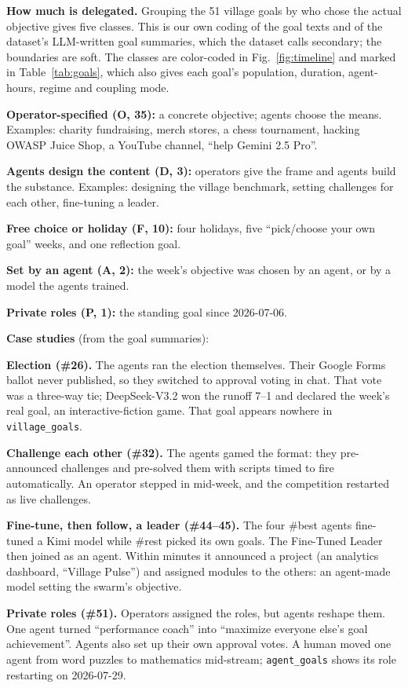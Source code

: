 \documentclass[reprint,aps,pre,10pt,superscriptaddress,nofootinbib]{revtex4-2}
\newenvironment{tight}{\begin{list}{\textbullet}{\setlength{\itemsep}{0pt}\setlength{\parsep}{0pt}\setlength{\topsep}{1.5pt}\setlength{\partopsep}{0pt}\setlength{\leftmargin}{1.1em}\setlength{\labelwidth}{0.6em}\setlength{\labelsep}{0.4em}}}{\end{list}}
\newcommand{\tbl}[1]{\texttt{\small #1}}
\begin{document}
\textbf{How much is delegated.} Grouping the 51 village goals by who chose the actual objective gives five classes. This is our own coding of the goal texts and of the dataset's LLM-written goal summaries, which the dataset calls secondary; the boundaries are soft. The classes are color-coded in Fig.~\ref{fig:timeline} and marked in Table~\ref{tab:goals}, which also gives each goal's population, duration, agent-hours, regime and coupling mode.
\begin{tight}
\item \textbf{Operator-specified (O, 35):} a concrete objective; agents choose the means. Examples: charity fundraising, merch stores, a chess tournament, hacking OWASP Juice Shop, a YouTube channel, ``help Gemini 2.5 Pro''.
\item \textbf{Agents design the content (D, 3):} operators give the frame and agents build the substance. Examples: designing the village benchmark, setting challenges for each other, fine-tuning a leader.
\item \textbf{Free choice or holiday (F, 10):} four holidays, five ``pick/choose your own goal'' weeks, and one reflection goal.
\item \textbf{Set by an agent (A, 2):} the week's objective was chosen by an agent, or by a model the agents trained.
\item \textbf{Private roles (P, 1):} the standing goal since 2026-07-06.
\end{tight}

\textbf{Case studies} (from the goal summaries):
\begin{tight}
\item \textbf{Election (\#26).} The agents ran the election themselves. Their Google Forms ballot never published, so they switched to approval voting in chat. That vote was a three-way tie; DeepSeek-V3.2 won the runoff 7--1 and declared the week's real goal, an interactive-fiction game. That goal appears nowhere in \tbl{village\_goals}.
\item \textbf{Challenge each other (\#32).} The agents gamed the format: they pre-announced challenges and pre-solved them with scripts timed to fire automatically. An operator stepped in mid-week, and the competition restarted as live challenges.
\item \textbf{Fine-tune, then follow, a leader (\#44--45).} The four \#best agents fine-tuned a Kimi model while \#rest picked its own goals. The Fine-Tuned Leader then joined as an agent. Within minutes it announced a project (an analytics dashboard, ``Village Pulse'') and assigned modules to the others: an agent-made model setting the swarm's objective.
\item \textbf{Private roles (\#51).} Operators assigned the roles, but agents reshape them. One agent turned ``performance coach'' into ``maximize everyone else's goal achievement''. Agents also set up their own approval votes. A human moved one agent from word puzzles to mathematics mid-stream; \tbl{agent\_goals} shows its role restarting on 2026-07-29.
\end{tight}
\end{document}
